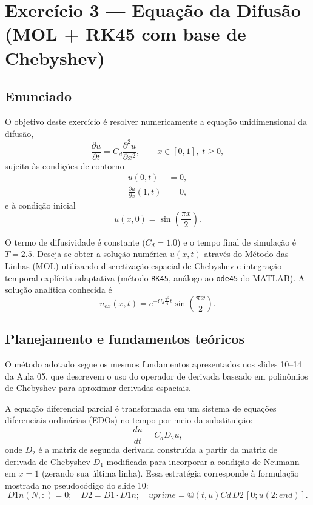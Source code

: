 \documentclass[12pt,a4paper]{article}
\begin{document}
\section{Exercício 3 — Equação da Difusão (MOL + RK45 com base de Chebyshev)}

\subsection{Enunciado}

O objetivo deste exercício é resolver numericamente a equação unidimensional da difusão,
\begin{equation}
    \frac{\partial u}{\partial t} = C_d \frac{\partial^2 u}{\partial x^2}, \qquad x \in [0,1], \; t \ge 0,
\end{equation}
sujeita às condições de contorno
\begin{align}
    u(0,t) &= 0, \\
    \frac{\partial u}{\partial x}(1,t) &= 0,
\end{align}
e à condição inicial
\begin{equation}
    u(x,0) = \sin\!\left(\frac{\pi x}{2}\right).
\end{equation}

O termo de difusividade é constante ($C_d = 1.0$) e o tempo final de simulação é $T = 2.5$. 
Deseja-se obter a solução numérica $u(x,t)$ através do Método das Linhas (MOL) utilizando discretização espacial de Chebyshev e integração temporal explícita adaptativa (método \texttt{RK45}, análogo ao \texttt{ode45} do MATLAB). 
A solução analítica conhecida é
\begin{equation}
    u_{ex}(x,t) = e^{-C_d \frac{\pi^2}{4} t} \sin\!\left(\frac{\pi x}{2}\right).
\end{equation}

\subsection{Planejamento e fundamentos teóricos}

O método adotado segue os mesmos fundamentos apresentados nos slides 10–14 da Aula 05, que descrevem o uso do operador de derivada baseado em polinômios de Chebyshev para aproximar derivadas espaciais. 

A equação diferencial parcial é transformada em um sistema de equações diferenciais ordinárias (EDOs) no tempo por meio da substituição:
\begin{equation}
    \frac{du}{dt} = C_d D_2 u,
\end{equation}
onde $D_2$ é a matriz de segunda derivada construída a partir da matriz de derivada de Chebyshev $D_1$ modificada para incorporar a condição de Neumann em $x=1$ (zerando sua última linha). Essa estratégia corresponde à formulação mostrada no pseudocódigo do slide 10:
\[
    D1n(N,:) = 0; \quad D2 = D1 \cdot D1n; \quad uprime = @(t,u) Cd \, D2 \,[0;u(2:end)].
\]
\end{document}

